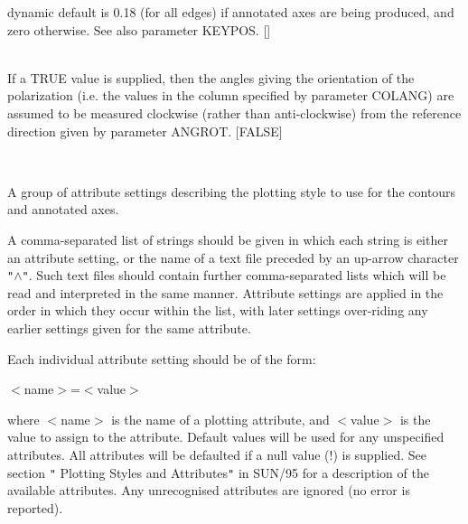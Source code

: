 \documentclass[twoside,11pt]{article}
\newcommand{\xref}[3]{#1}
\renewcommand{\_}{\texttt{\symbol{95}}}
\newcommand{\sstsubsection}[1]{ \item[{#1}] \mbox{} \\}
\newcommand{\sstsubsection}[1]{\item[{#1}]}
\begin{document}
{{{         dynamic default is 0.18 (for all edges) if annotated axes are being
         produced, and zero otherwise. See also parameter KEYPOS. []
      }
      \sstsubsection{
         NEGATE = \_LOGICAL (Read)
      }{
         If a TRUE value is supplied, then the angles giving the
         orientation of the polarization (i.e. the values in the column
         specified by parameter COLANG) are assumed to be measured clockwise
         (rather than anti-clockwise) from the reference direction given
         by parameter ANGROT. [FALSE]
      }
      \sstsubsection{
         STYLE = GROUP (Read)
      }{
         A group of attribute settings describing the plotting style to use
         for the contours and annotated axes.

         A comma-separated list of strings should be given in which each
         string is either an attribute setting, or the name of a text file
         preceded by an up-arrow character {\tt "}$\wedge${\tt "}. Such text files should
         contain further comma-separated lists which will be read and
         interpreted in the same manner. Attribute settings are applied in
         the order in which they occur within the list, with later settings
         over-riding any earlier settings given for the same attribute.

         Each individual attribute setting should be of the form:

            $<$name$>$=$<$value$>$

         where $<$name$>$ is the name of a plotting attribute, and $<$value$>$ is
         the value to assign to the attribute. Default values will be
         used for any unspecified attributes. All attributes will be
         defaulted if a null value (!) is supplied. See section {\tt "}
         \xref{Plotting Styles and Attributes}{sun95}{se_style}{\tt "} in 
         \xref{SUN/95}{sun95}{} for a description of the available
         attributes. Any unrecognised attributes are ignored (no error is
         reported).

}}}
\end{document}
